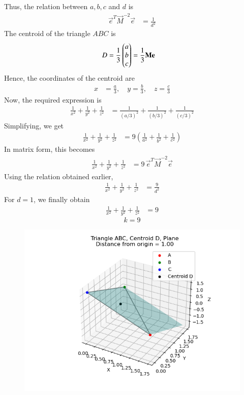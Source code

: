 \documentclass[journal]{IEEEtran}
\begin{document}
Thus, the relation between $a,b,c$ and $d$ is
\begin{align}
\vec{e}^T \vec{M}^{-2} \vec{e} &= \frac{1}{d^2}
\end{align}
The centroid of the triangle $ABC$ is
\begin{align}
D &= \frac{1}{3} \begin{pmatrix} a \\ b \\ c \end{pmatrix} 
= \frac{1}{3} \mathbf{M} \mathbf{e}
\end{align}
Hence, the coordinates of the centroid are
\begin{align}
x &= \tfrac{a}{3}, \quad y = \tfrac{b}{3}, \quad z = \tfrac{c}{3}
\end{align}
Now, the required expression is
\begin{align}
\frac{1}{x^2} + \frac{1}{y^2} + \frac{1}{z^2} 
&= \frac{1}{(a/3)^2} + \frac{1}{(b/3)^2} + \frac{1}{(c/3)^2}
\end{align}
Simplifying, we get
\begin{align}
\frac{1}{x^2} + \frac{1}{y^2} + \frac{1}{z^2}
&= 9\left(\frac{1}{a^2} + \frac{1}{b^2} + \frac{1}{c^2}\right)
\end{align}
In matrix form, this becomes
\begin{align}
\frac{1}{x^2} + \frac{1}{y^2} + \frac{1}{z^2}
&= 9\, \vec{e}^T \vec{M}^{-2} \vec{e}
\end{align}
Using the relation obtained earlier,
\begin{align}
\frac{1}{x^2} + \frac{1}{y^2} + \frac{1}{z^2}
&= \frac{9}{d^2}
\end{align}
For $d=1$, we finally obtain
\begin{align}
\frac{1}{x^2} + \frac{1}{y^2} + \frac{1}{z^2} &= 9
\end{align}
\[
\boxed{k=9}
\]
\begin{figure}[H]
    \centering
    \includegraphics[width=0.435\linewidth]{figs/fig1.png}
    \caption{}
    \label{fig:fig1}
\end{figure}
\end{document}
